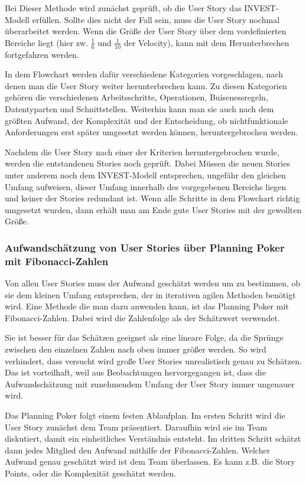 \documentclass[acmtog]{acmart}
\begin{document}
Bei Dieser Methode wird zunächst geprüft, ob die User Story das INVEST-Modell erfüllen. Sollte dies nicht der Fall sein, muss die User Story nochmal 
überarbeitet werden. Wenn die Größe der User Story über dem vordefinierten Bereiche liegt (hier zw. \( \frac{1}{6} \) und \( \frac{1}{10} \) der Velocity), kann mit dem Herunterbrechen 
fortgefahren werden. \cite{humanizingwork}

In dem Flowchart werden dafür verschiedene Kategorien vorgeschlagen, nach denen man die User Story weiter herunterbrechen kann. Zu diesen Kategorien 
gehören die verschiedenen Arbeitsschritte, Operationen, Buisenessregeln, Datentyparten und Schnittstellen. Weiterhin kann man sie auch nach dem größten 
Aufwand, der Komplexität und der Entscheidung, ob nichtfunktionale Anforderungen erst später umgesetzt werden können, heruntergebrochen werden. \cite{humanizingwork}

Nachdem die User Story nach einer der Kriterien heruntergebrochen wurde, werden die entstandenen Stories noch geprüft. Dabei Müssen die neuen Stories 
unter anderem noch dem INVEST-Modell entsprechen, ungefähr den gleichen Umfang aufweisen, dieser Umfang innerhalb des vorgegebenen Bereichs liegen und 
keiner der Stories redundant ist. Wenn alle Schritte in dem Flowchart richtig umgesetzt wurden, dann erhält man am Ende gute User Stories mit der 
gewollten Größe. \cite{humanizingwork}

\subsubsection{Aufwandschätzung von User Stories über Planning Poker mit Fibonacci-Zahlen} \label{sec:effort}

Von allen User Stories muss der Aufwand geschätzt werden um zu bestimmen, ob sie dem kleinen Umfang entsprechen, der in iterativen agilen Methoden 
benötigt wird. Eine Methode die man dazu anwenden kann, ist das Planning Poker mit Fibonacci-Zahlen. Dabei wird die Zahlenfolge als der Schätzwert verwendet. \cite{planingpoker}

Sie ist besser für das Schätzen geeignet als eine lineare Folge, da die Sprünge zwischen den einzelnen Zahlen nach oben immer größer werden. So wird 
verhindert, dass versucht wird große User Stories unrealistisch genau zu Schätzen. Das ist vorteilhaft, weil aus Beobachtungen hervorgegangen ist, dass 
die Aufwandschätzung mit zunehmendem Umfang der User Story immer ungenauer wird. \cite{planingpoker}

Das Planning Poker folgt einem festen Ablaufplan. Im ersten Schritt wird die User Story zunächst dem Team präsentiert. Daraufhin wird sie im Team diskutiert, 
damit ein einheitliches Verständnis entsteht. Im dritten Schritt schätzt dann jedes Mitglied den Aufwand mithilfe der Fibonacci-Zahlen. Welcher Aufwand genau 
geschätzt wird ist dem Team überlassen. Es kann z.B. die Story Points, oder die Komplexität geschätzt werden. \cite{planingpoker}
\end{document}
